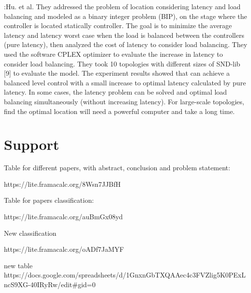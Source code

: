 \documentclass[a4paper,10pt]{article}
\begin{document}
\cite{HuLu16}:Hu. et al. They addressed the problem of location considering latency and load balancing and modeled as a binary integer problem (BIP), on the stage where the controller is located statically controller. The goal is to minimize the average latency and latency worst case when the load is balanced between the controllers (pure latency), then analyzed the cost of latency to consider load balancing. They used the software CPLEX optimizer to evaluate the increase in latency to consider load balancing. They took 10 topologies with different sizes of SND-lib [9] to evaluate the model. The experiment results showed that can achieve a balanced level control with a small increase to optimal latency calculated by pure latency. In some cases, the latency problem can be solved and optimal load balancing simultaneously (without increasing latency). For large-scale topologies, find the optimal location will need a powerful computer and take a long time.





\section{Support}

Table for different papers, with abstract, conclusion and problem statement:

https://lite.framacalc.org/8Wsn7JJBfH

Table for papers classification:

https://lite.framacalc.org/auBmGx08yd

New classification

https://lite.framacalc.org/oADf7JaMYF

new table 
https://docs.google.com/spreadsheets/d/1GnxnGbTXQAAec4c3FVZlig5K0PExLncS9XG-40IRyRw/edit#gid=0
\end{document}
